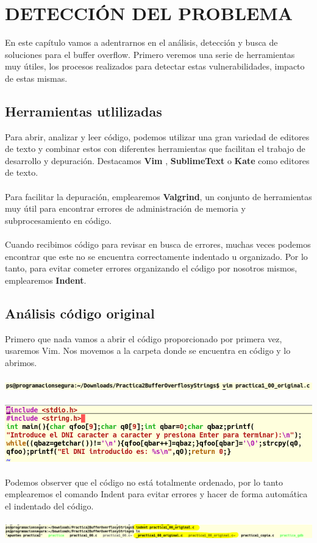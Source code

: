 \chapter{DETECCIÓN DEL PROBLEMA}
\noindent En este capítulo vamos a adentrarnos en el análisis, detección y busca de soluciones para  el buffer overflow. Primero veremos una serie de herramientas muy útiles, los procesos realizados para detectar estas vulnerabilidades, impacto de estas mismas.

\section{Herramientas utlilizadas}
\noindent Para abrir, analizar y leer código, podemos utilizar una gran variedad de editores de texto y combinar estos con diferentes herramientas que facilitan el trabajo de desarrollo y depuración. Destacamos \textbf{Vim} , {\textbf{SublimeText}} o {\textbf{Kate}} como editores de texto.
\\\\
Para facilitar la depuración, emplearemos \textbf{Valgrind}, un conjunto de herramientas muy útil para encontrar errores de administración de memoria y subprocesamiento en código.
\\\\
Cuando recibimos código para revisar en busca de errores, muchas veces podemos encontrar que este no se encuentra correctamente indentado u organizado. Por lo tanto, para evitar cometer errores organizando el código por nosotros mismos, emplearemos \textbf{Indent}.

\section{Análisis código original}
\noindent Primero que nada vamos a abrir el código proporcionado por primera vez, usaremos Vim.  Nos movemos a la carpeta donde se encuentra en código y lo abrimos.
\\\\
 \includegraphics[width=1\textwidth]{mainmatter/Fotos Codigo/1.png}
 \\\\
\includegraphics[width=1\textwidth]{mainmatter/Fotos Codigo/codigo sin indent.png}
\\\\
\noindent Podemos observer que el código no está totalmente ordenado, por lo tanto emplearemos el comando Indent para evitar errores y hacer de forma automática el indentado del código.
\\\\
\includegraphics[width=1\textwidth]{mainmatter/Fotos Codigo/indent1.png}

